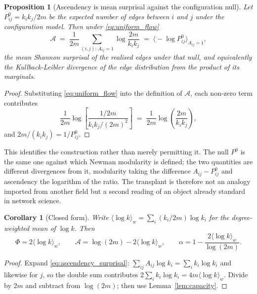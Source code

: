 \documentclass[11pt,a4paper]{article}
\newtheorem{proposition}{Proposition}
\newtheorem{corollary}{Corollary}
\begin{document}
\begin{proposition}[Ascendency is mean surprisal against the configuration
null]
\label{prop:ascendency_null}
Let $P^0_{ij} = k_i k_j / 2m$ be the expected number of edges between $i$ and
$j$ under the configuration model. Then under \eqref{eq:uniform_flow}
\begin{equation}
\mathcal{A} \;=\; \frac{1}{2m}\sum_{(i,j):\,A_{ij}=1}
\log\frac{2m}{k_i k_j}
\;=\; \big\langle -\log P^0_{ij} \big\rangle_{A_{ij}=1},
\label{eq:ascendency_surprisal}
\end{equation}
the mean Shannon surprisal of the realised edges under that null, and
equivalently the Kullback-Leibler divergence of the edge distribution from the
product of its marginals.
\end{proposition}

\begin{proof}
Substituting \eqref{eq:uniform_flow} into the definition of $\mathcal{A}$, each
non-zero term contributes
\[
\frac{1}{2m}\log\!\left[\frac{1/2m}{k_ik_j/(2m)^2}\right]
\;=\; \frac{1}{2m}\log\!\left(\frac{2m}{k_ik_j}\right),
\]
and $2m/(k_ik_j) = 1/P^0_{ij}$.
\end{proof}

This identifies the construction rather than merely permitting it. The null
$P^0$ is the same one against which Newman modularity is defined; the two
quantities are different divergences from it, modularity taking the difference
$A_{ij} - P^0_{ij}$ and ascendency the logarithm of the ratio. The transplant
is therefore not an analogy imported from another field but a second reading of
an object already standard in network science.

\begin{corollary}[Closed form]
\label{cor:closed_form}
Write $\langle \log k\rangle_w = \sum_i (k_i/2m)\log k_i$ for the
degree-weighted mean of $\log k$. Then
\begin{equation}
\Phi = 2\langle \log k\rangle_w,
\qquad
\mathcal{A} = \log(2m) - 2\langle \log k\rangle_w,
\qquad
\alpha = 1 - \frac{2\langle \log k\rangle_w}{\log(2m)} .
\label{eq:closed_form}
\end{equation}
\end{corollary}

\begin{proof}
Expand \eqref{eq:ascendency_surprisal}: $\sum_{ij} A_{ij}\log k_i = \sum_i k_i
\log k_i$ and likewise for $j$, so the double sum contributes $2\sum_i k_i \log
k_i = 4m \langle \log k\rangle_w$. Divide by $2m$ and subtract from
$\log(2m)$; then use Lemma~\ref{lem:capacity}.
\end{proof}
\end{document}

